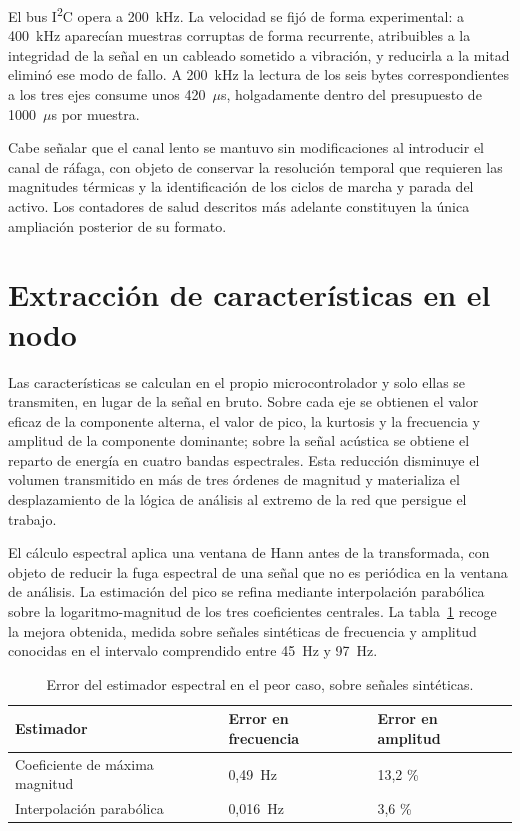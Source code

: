 El bus I\textsuperscript{2}C opera a \mbox{200 kHz}. La velocidad se fijó de forma
experimental: a \mbox{400 kHz} aparecían muestras corruptas de forma recurrente, atribuibles
a la integridad de la señal en un cableado sometido a vibración, y reducirla a la mitad
eliminó ese modo de fallo. A \mbox{200 kHz} la lectura de los seis bytes correspondientes a
los tres ejes consume unos \mbox{420 $\mu$s}, holgadamente dentro del presupuesto de
\mbox{1000 $\mu$s} por muestra.

Cabe señalar que el canal lento se mantuvo sin modificaciones al introducir el canal de
ráfaga, con objeto de conservar la resolución temporal que requieren las magnitudes térmicas
y la identificación de los ciclos de marcha y parada del activo. Los contadores de salud
descritos más adelante constituyen la única ampliación posterior de su formato.

\section{Extracción de características en el nodo}

Las características se calculan en el propio microcontrolador y solo ellas se transmiten, en
lugar de la señal en bruto. Sobre cada eje se obtienen el valor eficaz de la componente
alterna, el valor de pico, la kurtosis y la frecuencia y amplitud de la componente
dominante; sobre la señal acústica se obtiene el reparto de energía en cuatro bandas
espectrales. Esta reducción disminuye el volumen transmitido en más de tres órdenes de
magnitud y materializa el desplazamiento de la lógica de análisis al extremo de la red que
persigue el trabajo.

El cálculo espectral aplica una ventana de Hann antes de la transformada, con objeto de
reducir la fuga espectral de una señal que no es periódica en la ventana de análisis. La
estimación del pico se refina mediante interpolación parabólica sobre la logaritmo-magnitud
de los tres coeficientes centrales. La tabla~\ref{table:estimador} recoge la mejora
obtenida, medida sobre señales sintéticas de frecuencia y amplitud conocidas en el intervalo
comprendido entre \mbox{45 Hz} y \mbox{97 Hz}.

\begin{table}[ht!]
\caption{Error del estimador espectral en el peor caso, sobre señales sintéticas.}
\label{table:estimador}
\centering
\begin{tabular}{|p{5.5cm}|p{3.2cm}|p{3.2cm}|}
\hline
\textbf{Estimador} & \textbf{Error en frecuencia} & \textbf{Error en amplitud} \\
\hline
Coeficiente de máxima magnitud & \mbox{0,49 Hz} & 13,2 \% \\
\hline
Interpolación parabólica & \mbox{0,016 Hz} & 3,6 \% \\
\hline
\end{tabular}
\end{table}

